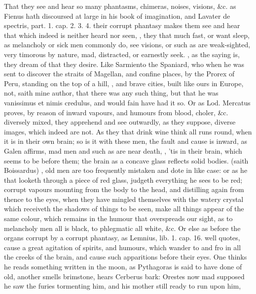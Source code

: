 {That they see and hear so many phantasms, chimeras, noises, visions,
\&c. as Fienus hath discoursed at large in his book of imagination, and
 Lavater de spectris, part. 1. cap. 2. 3. 4. their corrupt
phantasy makes them see and hear that which indeed is neither heard nor
seen, , they that much
fast, or want sleep, as melancholy or sick men commonly do, see
visions, or such as are weak-sighted, very timorous by nature, mad,
distracted, or earnestly seek. , as the
saying is, they dream of that they desire. Like Sarmiento the Spaniard,
who when he was sent to discover the straits of Magellan, and confine
places, by the Prorex of Peru, standing on the top of a hill,
, and brave cities,
built like ours in Europe, not, saith mine author, that there was
any such thing, but that he was vanissimus et nimis credulus, and would
fain have had it so. Or as Lod. Mercatus proves, by reason of
inward vapours, and humours from blood, choler, \&c. diversely mixed,
they apprehend and see outwardly, as they suppose, diverse images, which
indeed are not. As they that drink wine think all runs round, when it
is in their own brain; so is it with these men, the fault and cause is
inward, as Galen affirms, mad men and such as are near death,
, 'tis in
their brain, which seems to be before them; the brain as a concave
glass reflects solid bodies.  (saith Boissardus)
, old men are too frequently mistaken and dote in like
case: or as he that looketh through a piece of red glass, judgeth
everything he sees to be red; corrupt vapours mounting from the body to
the head, and distilling again from thence to the eyes, when they have
mingled themselves with the watery crystal which receiveth the shadows
of things to be seen, make all things appear of the same colour, which
remains in the humour that overspreads our sight, as to melancholy men
all is black, to phlegmatic all white, \&c. Or else as before the organs
corrupt by a corrupt phantasy, as Lemnius, lib. 1. cap. 16. well
quotes, cause a great agitation of spirits, and humours, which
wander to and fro in all the creeks of the brain, and cause such
apparitions before their eyes. One thinks he reads something written in
the moon, as Pythagoras is said to have done of old, another smells
brimstone, hears Cerberus bark: Orestes now mad supposed he saw the
furies tormenting him, and his mother still ready to run upon him,

}
